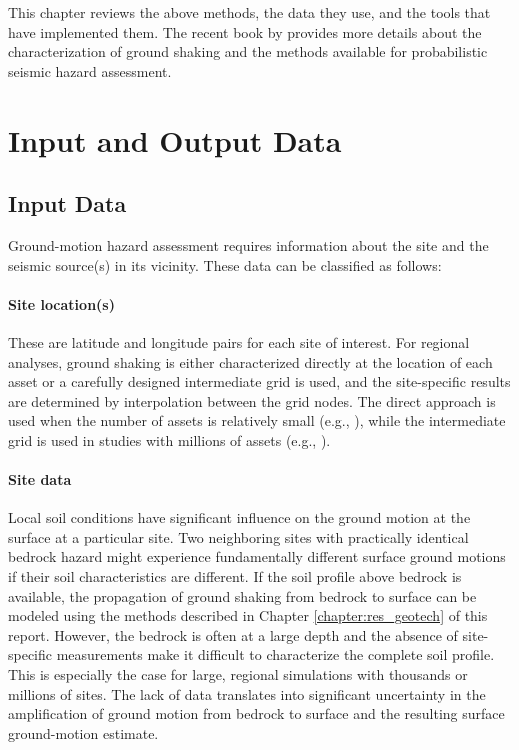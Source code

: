 This chapter reviews the above methods, the data they use, and the tools that have implemented them. The recent book by \citet{baker2021seismic} provides more details about the characterization of ground shaking and the methods available for probabilistic seismic hazard assessment. 

\section{Input and Output Data}
\label{sec:eq_shake_io}

\subsection{Input Data}

Ground-motion hazard assessment requires information about the site and the seismic source(s) in its vicinity. These data can be classified as follows:

\paragraph{Site location(s)} These are latitude and longitude pairs for each site of interest. For regional analyses, ground shaking is either characterized directly at the location of each asset or a carefully designed intermediate grid is used, and the site-specific results are determined by interpolation between the grid nodes. The direct approach is used when the number of assets is relatively small (e.g., \cite{padgett2010regional}), while the intermediate grid is used in studies with millions of assets (e.g., \cite{deierlein2020cloud}).


\paragraph{Site data} Local soil conditions have significant influence on the ground motion at the surface at a particular site. Two neighboring sites with practically identical bedrock hazard might experience fundamentally different surface ground motions if their soil characteristics are different. If the soil profile above bedrock is available, the propagation of ground shaking from bedrock to surface can be modeled using the methods described in Chapter \ref{chapter:res_geotech} of this report. However, the bedrock is often at a large depth and the absence of site-specific measurements make it difficult to characterize the complete soil profile. This is especially the case for large, regional simulations with thousands or millions of sites. The lack of data translates into significant uncertainty in the amplification of ground motion from bedrock to surface and the resulting surface ground-motion estimate. 

